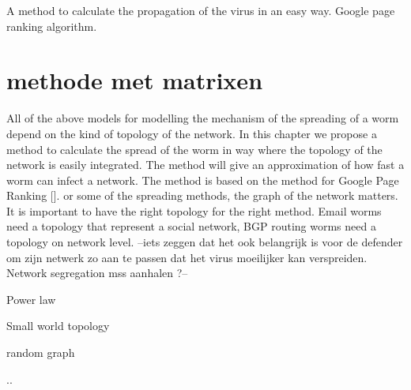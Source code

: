 A method to calculate the propagation of the virus in an easy way. Google page ranking algorithm. 





\section{methode met matrixen}
\label{eigenmatrixmethode}

All of the above models for modelling the mechanism of the spreading of a worm depend on the kind of topology of the network. In this chapter we propose a method to calculate the spread of the worm in way where the topology of the network is easily integrated. The method will give an approximation of how fast a worm can infect a network. The method is based on the method for Google Page Ranking  []. 
or some of the spreading methods, the graph of the network matters. It is important to have the right topology for the right method. Email worms need a topology that represent a social network, BGP routing worms need a topology on network level. 
--iets zeggen dat het ook belangrijk is voor de defender om zijn netwerk zo aan te passen dat het virus moeilijker kan verspreiden. Network segregation mss aanhalen ?--

\begin{description}
\item Power law
\item Small world topology
\item random graph
\item ..
\end{description}



